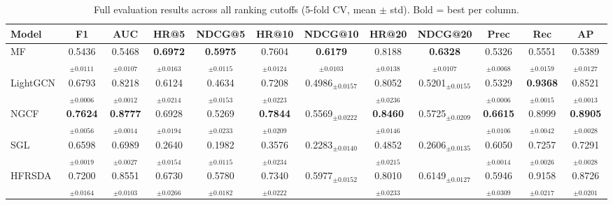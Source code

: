 \begin{table}[t]
\centering
\caption{Full evaluation results across all ranking cutoffs (5-fold CV, mean $\pm$ std).
         Bold = best per column.}
\label{tab:full_results}
\setlength{\tabcolsep}{3.5pt}
\small
\begin{tabular}{l|cc|cc|cc|cc|cc|c}
\toprule
\textbf{Model}
  & \textbf{F1} & \textbf{AUC}
  & \textbf{HR@5} & \textbf{NDCG@5}
  & \textbf{HR@10} & \textbf{NDCG@10}
  & \textbf{HR@20} & \textbf{NDCG@20}
  & \textbf{Prec} & \textbf{Rec}
  & \textbf{AP} \\
\midrule
MF & 0.5436$_{\pm0.0111}$ & 0.5468$_{\pm0.0107}$ & \textbf{0.6972$_{\pm0.0163}$} & \textbf{0.5975$_{\pm0.0115}$} & 0.7604$_{\pm0.0124}$ & \textbf{0.6179$_{\pm0.0103}$} & 0.8188$_{\pm0.0138}$ & \textbf{0.6328$_{\pm0.0107}$} & 0.5326$_{\pm0.0068}$ & 0.5551$_{\pm0.0159}$ & 0.5389$_{\pm0.0127}$ \\
LightGCN & 0.6793$_{\pm0.0006}$ & 0.8218$_{\pm0.0012}$ & 0.6124$_{\pm0.0214}$ & 0.4634$_{\pm0.0153}$ & 0.7208$_{\pm0.0223}$ & 0.4986$_{\pm0.0157}$ & 0.8052$_{\pm0.0236}$ & 0.5201$_{\pm0.0155}$ & 0.5329$_{\pm0.0006}$ & \textbf{0.9368$_{\pm0.0015}$} & 0.8521$_{\pm0.0013}$ \\
NGCF & \textbf{0.7624$_{\pm0.0056}$} & \textbf{0.8777$_{\pm0.0014}$} & 0.6928$_{\pm0.0194}$ & 0.5269$_{\pm0.0233}$ & \textbf{0.7844$_{\pm0.0209}$} & 0.5569$_{\pm0.0222}$ & \textbf{0.8460$_{\pm0.0146}$} & 0.5725$_{\pm0.0209}$ & \textbf{0.6615$_{\pm0.0106}$} & 0.8999$_{\pm0.0042}$ & \textbf{0.8905$_{\pm0.0028}$} \\
SGL & 0.6598$_{\pm0.0019}$ & 0.6989$_{\pm0.0027}$ & 0.2640$_{\pm0.0154}$ & 0.1982$_{\pm0.0115}$ & 0.3576$_{\pm0.0234}$ & 0.2283$_{\pm0.0140}$ & 0.4852$_{\pm0.0215}$ & 0.2606$_{\pm0.0135}$ & 0.6050$_{\pm0.0014}$ & 0.7257$_{\pm0.0026}$ & 0.7291$_{\pm0.0028}$ \\
HFRSDA & 0.7200$_{\pm0.0164}$ & 0.8551$_{\pm0.0103}$ & 0.6730$_{\pm0.0266}$ & 0.5780$_{\pm0.0182}$ & 0.7340$_{\pm0.0222}$ & 0.5977$_{\pm0.0152}$ & 0.8010$_{\pm0.0233}$ & 0.6149$_{\pm0.0127}$ & 0.5946$_{\pm0.0309}$ & 0.9158$_{\pm0.0217}$ & 0.8726$_{\pm0.0201}$ \\
\bottomrule
\end{tabular}
\end{table}
